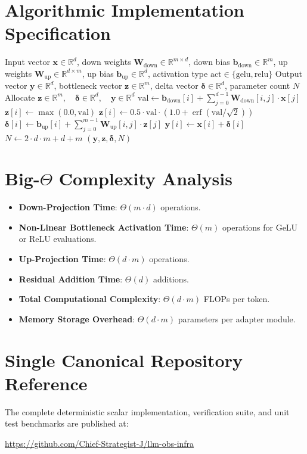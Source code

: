 \documentclass[11pt,a4paper]{article}
\theoremstyle{definition}
\begin{document}
\section{Algorithmic Implementation Specification}

\begin{algorithm}[H]
\caption{Bottleneck Adapter Forward Computation}
\begin{algorithmic}[1]
\Require Input vector $\mathbf{x} \in \mathbb{R}^d$, down weights $\mathbf{W}_{\text{down}} \in \mathbb{R}^{m \times d}$, down bias $\mathbf{b}_{\text{down}} \in \mathbb{R}^m$, up weights $\mathbf{W}_{\text{up}} \in \mathbb{R}^{d \times m}$, up bias $\mathbf{b}_{\text{up}} \in \mathbb{R}^d$, activation type $\text{act} \in \{\text{gelu}, \text{relu}\}$
\Ensure Output vector $\mathbf{y} \in \mathbb{R}^d$, bottleneck vector $\mathbf{z} \in \mathbb{R}^m$, delta vector $\mathbf{\delta} \in \mathbb{R}^d$, parameter count $N$
\State Allocate $\mathbf{z} \in \mathbb{R}^m, \quad \mathbf{\delta} \in \mathbb{R}^d, \quad \mathbf{y} \in \mathbb{R}^d$
    \State $\text{val} \gets \mathbf{b}_{\text{down}}[i] + \sum_{j=0}^{d-1} \mathbf{W}_{\text{down}}[i, j] \cdot \mathbf{x}[j]$
        \State $\mathbf{z}[i] \gets \max(0.0, \text{val})$
    \Else
        \State $\mathbf{z}[i] \gets 0.5 \cdot \text{val} \cdot \left(1.0 + \operatorname{erf}(\text{val} / \sqrt{2})\right)$
    \EndIf
\EndFor
{}
    \State $\mathbf{\delta}[i] \gets \mathbf{b}_{\text{up}}[i] + \sum_{j=0}^{m-1} \mathbf{W}_{\text{up}}[i, j] \cdot \mathbf{z}[j]$
    \State $\mathbf{y}[i] \gets \mathbf{x}[i] + \mathbf{\delta}[i]$
\EndFor
\State $N \gets 2 \cdot d \cdot m + d + m$
\State \Return $(\mathbf{y}, \mathbf{z}, \mathbf{\delta}, N)$
\end{algorithmic}
\end{algorithm}

\section{Big-$\Theta$ Complexity Analysis}

\begin{itemize}
    \item \textbf{Down-Projection Time}: $\Theta(m \cdot d)$ operations.
    \item \textbf{Non-Linear Bottleneck Activation Time}: $\Theta(m)$ operations for GeLU or ReLU evaluations.
    \item \textbf{Up-Projection Time}: $\Theta(d \cdot m)$ operations.
    \item \textbf{Residual Addition Time}: $\Theta(d)$ additions.
    \item \textbf{Total Computational Complexity}: $\Theta(d \cdot m)$ FLOPs per token.
    \item \textbf{Memory Storage Overhead}: $\Theta(d \cdot m)$ parameters per adapter module.
\end{itemize}

\section{Single Canonical Repository Reference}

The complete deterministic scalar implementation, verification suite, and unit test benchmarks are published at:
\begin{center}
\url{https://github.com/Chief-Strategist-J/llm-obs-infra}
\end{center}
\end{document}
